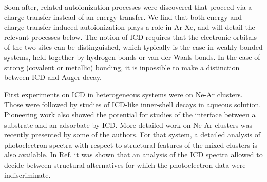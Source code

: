 Soon after, related 
autoionization processes were discovered that proceed via a 
charge transfer instead of an energy transfer. 
We find that both energy and charge transfer induced 
autoionization plays a role in Ar-Xe, and will detail the 
relevant processes below. The notion of ICD requires that the 
electronic orbitals of the two sites can be distinguished, which 
typically is the case in weakly bonded systems, held together by 
hydrogen bonds or van-der-Waals bonds. In the case of strong
(covalent or metallic) bonding, it is inpossible to make a
distinction between ICD and Auger decay.\cite{hergenhahn_review}

First experiments on ICD in heterogeneous systems were on Ne-Ar 
clusters.\cite{barthnear} Those were followed by studies of 
ICD-like inner-shell decays in aqueous solution.\cite{aziz,pokapanich,pokapanich2011}
Pioneering work also showed the 
potential for studies of the interface between a substrate and an 
adsorbate by ICD.\cite{grieves} More detailed work on Ne-Ar 
clusters was recently presented by some of the authors.\cite{
fasshauer2014} For that system, a detailed analysis of 
photoelectron spectra with respect to structural features of the 
mixed clusters is also available.\cite{lundwall} In Ref.  it was shown that an analysis of the ICD spectra 
allowed to decide between structural alternatives for which the 
photoelectron data were indiscriminate.

